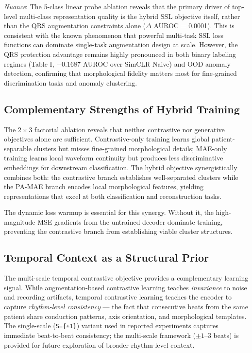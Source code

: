 \documentclass[journal,10pt]{IEEEtran}
\begin{document}
\noindent\textit{Nuance}: The 5-class linear probe ablation reveals that the primary driver of top-level multi-class representation quality is the hybrid SSL objective itself, rather than the QRS augmentation constraints alone ($\Delta$ AUROC = 0.0001). This is consistent with the known phenomenon that powerful multi-task SSL loss functions can dominate single-task augmentation design at scale. However, the QRS protection advantage remains highly pronounced in both binary labeling regimes (Table I, +0.1687 AUROC over SimCLR Naive) and OOD anomaly detection, confirming that morphological fidelity matters most for fine-grained discrimination tasks and anomaly clustering.

\subsection{Complementary Strengths of Hybrid Training}

The $2 \times 3$ factorial ablation reveals that neither contrastive nor generative objectives alone are sufficient. Contrastive-only training learns global patient-separable clusters but misses fine-grained morphological details; MAE-only training learns local waveform continuity but produces less discriminative embeddings for downstream classification. The hybrid objective synergistically combines both: the contrastive branch establishes well-separated clusters while the PA-MAE branch encodes local morphological features, yielding representations that excel at both classification and reconstruction tasks.

The dynamic loss warmup is essential for this synergy. Without it, the high-magnitude MSE gradients from the untrained decoder dominate training, preventing the contrastive branch from establishing viable cluster structures.

\subsection{Temporal Context as a Structural Prior}

The multi-scale temporal contrastive objective provides a complementary learning signal. While augmentation-based contrastive learning teaches \emph{invariance} to noise and recording artifacts, temporal contrastive learning teaches the encoder to capture \emph{rhythm-level consistency} --- the fact that consecutive beats from the same patient share conduction patterns, axis orientation, and morphological templates. The single-scale (\texttt{S=\{±1\}}) variant used in reported experiments captures immediate beat-to-beat consistency; the multi-scale framework ($\pm 1$--$3$ beats) is provided for future exploration of broader rhythm-level context.
\end{document}
